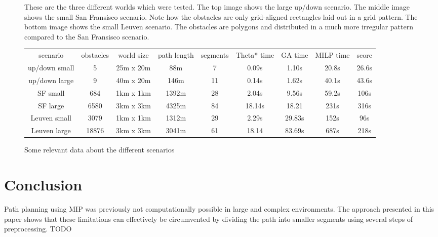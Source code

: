 \begin{figure}
    \caption{These are the three different worlds which were tested. The top image shows the large up/down scenario. The middle image shows the small San Fransisco scenario. Note how the obstacles are only grid-aligned rectangles laid out in a grid pattern. The bottom image shows the small Leuven scenario. The obstacles are polygons and distributed in a much more irregular pattern compared to the San Fransisco scenario.}\label{fig:scenarios}
\end{figure}


\begin{figure}
\begin{tabular}{ c c c c c c c c c }
 scenario & obstacles & world size & path length & segments & Theta* time & GA time & MILP time & score \\ 
up/down small & 5 &  25m x 20m & 88m  & 7 & 0.09s & 1.10s & 20.8s & 26.6s\\
up/down large & 9 & 40m x 20m &  146m & 11 & 0.14s & 1.62s & 40.1s & 43.6s \\
SF small & 684 & 1km x 1km & 1392m & 28 & 2.04s & 9.56s & 59.2s & 106s \\
SF large & 6580 & 3km x 3km & 4325m  & 84 & 18.14s & 18.21 & 231s & 316s\\
Leuven small & 3079 & 1km x 1km & 1312m & 29 &  2.29s & 29.83s & 152s  & 96s \\
Leuven large & 18876 & 3km x 3km & 3041m & 61 & 18.14 & 83.69s & 687s & 218s \\

\end{tabular}
\label{table: results}
\caption{Some relevant data about the different scenarios}
\end{figure}

\section{Conclusion}
Path planning using MIP was previously not computationally possible in large and complex environments. The approach presented in this paper shows that these limitations can effectively be circumvented by dividing the path into smaller segments using several steps of preprocessing. TODO